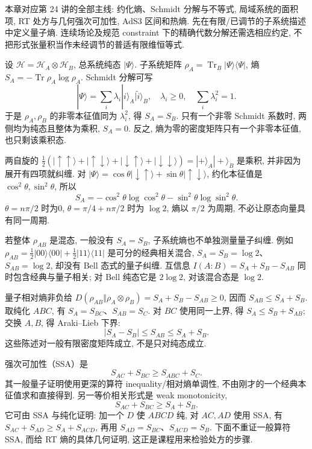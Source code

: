 本章对应第 24 讲的全部主线: 约化熵、Schmidt 分解与不等式, 局域系统的面积项, RT 处方与几何强次可加性, AdS3 区间和热熵. 先在有限/已调节的子系统描述中定义量子熵. 连续场论及规范 constraint 下的精确代数分解还需选相应约定, 不把形式张量积当作未经调节的普适有限维恒等式.

设 $\mathcal H=\mathcal H_A\otimes\mathcal H_B$, 总系统纯态 $|\Psi\rangle$. 子系统矩阵 $\rho_A=\operatorname{Tr}_B|\Psi\rangle\langle\Psi|$, 熵 $S_A=-\operatorname{Tr}\rho_A\log\rho_A$. Schmidt 分解可写
\[
|\Psi\rangle=\sum_i\lambda_i|i\rangle_A|\widetilde i\rangle_B,
\quad\lambda_i\ge0,\quad\sum_i\lambda_i^2=1.
\]
于是 $\rho_A,\rho_B$ 的非零本征值同为 $\lambda_i^2$, 得 $S_A=S_B$. 只有一个非零 Schmidt 系数时, 两侧均为纯态且整体为乘积, $S_A=0$. 反之, 熵为零的密度矩阵只有一个非零本征值, 也只剩该乘积态.

\begin{example}
两自旋的 $\tfrac12(|\uparrow\uparrow\rangle+|\uparrow\downarrow\rangle+|\downarrow\uparrow\rangle+|\downarrow\downarrow\rangle)=|+\rangle_A|+\rangle_B$ 是乘积, 并非因为展开有四项就纠缠. 对 $|\Psi\rangle=\cos\theta|\downarrow\uparrow\rangle+\sin\theta|\uparrow\downarrow\rangle$, 约化本征值是 $\cos^2\theta,\sin^2\theta$, 所以
\[
S_A=-\cos^2\theta\log\cos^2\theta
-\sin^2\theta\log\sin^2\theta.
\]
$\theta=n\pi/2$ 时为0, $\theta=\pi/4+n\pi/2$ 时为 $\log2$, 熵以 $\pi/2$ 为周期, 不必让原态向量具有同一周期.
\end{example}

若整体 $\rho_{AB}$ 是混态, 一般没有 $S_A=S_B$, 子系统熵也不单独测量量子纠缠. 例如 $\rho_{AB}=\tfrac12|00\rangle\langle00|+\tfrac12|11\rangle\langle11|$ 是可分的经典相关混合, $S_A=S_B=\log2$、$S_{AB}=\log2$, 却没有 Bell 态式的量子纠缠. 互信息 $I(A:B)=S_A+S_B-S_{AB}$ 同时包含经典与量子相关; 对 Bell 纯态它是 $2\log2$, 对该混合态是 $\log2$.

量子相对熵非负给 $D(\rho_{AB}\Vert\rho_A\otimes\rho_B)=S_A+S_B-S_{AB}\ge0$, 因而 $S_{AB}\le S_A+S_B$. 取纯化 $ABC$, 有 $S_A=S_{BC}$、$S_{AB}=S_C$. 对 $BC$ 使用同一上界, 得 $S_A\le S_B+S_{AB}$; 交换 $A,B$, 得 Araki--Lieb 下界:
\[
|S_A-S_B|\le S_{AB}\le S_A+S_B.
\]
这些陈述对一般有限密度矩阵成立, 不是只对纯态成立.

强次可加性（SSA）是
\[
S_{AC}+S_{BC}\ge S_{ABC}+S_C.
\]
其一般量子证明使用更深的算符 inequality/相对熵单调性, 不由刚才的一个经典本征值求和直接得到. 另一等价相关形式是 weak monotonicity,
\[
S_{AC}+S_{BC}\ge S_A+S_B.
\]
它可由 SSA 与纯化证明: 加一个 $D$ 使 $ABCD$ 纯, 对 $AC,AD$ 使用 SSA, 有 $S_{AC}+S_{AD}\ge S_A+S_{ACD}$, 再用 $S_{AD}=S_{BC}$、$S_{ACD}=S_B$. 下面不重证一般算符 SSA, 而给 RT 熵的具体几何证明, 这正是课程用来检验处方的步骤.

